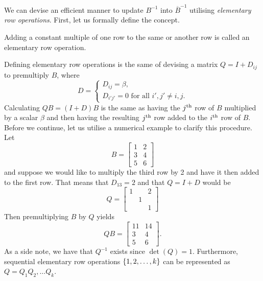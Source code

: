 We can devise an efficient manner to update $B^{-1}$ into $\overline{B}^{-1}$ utilising \emph{elementary row operations}. First, let us formally define the concept.

\begin{definition}
	Adding a constant multiple of one row to the same or another row is called an elementary row operation.
\end{definition}

Defining elementary row operations is the same of devising a matrix $Q = I + D_{ij}$ to premultiply $B$, where
%
\begin{equation*}
	D = \begin{cases}
		D_{ij} = \beta, \\
	    D_{i'j'} = 0 \text{ for all $i',j' \neq i,j$}.  
	\end{cases}
\end{equation*}
%
Calculating $QB = (I + D)B$ is the same as having the $j^\text{th}$ row of $B$ multiplied by a scalar $\beta$ and then having the resulting $j^\text{th}$ row added to the $i^\text{th}$ row of $B$. Before we continue, let us utilise a numerical example to clarify this procedure.
%
Let
%
\begin{equation*} 
	B = \begin{bmatrix} 1 & 2 \\ 3 & 4 \\ 5 & 6
		\end{bmatrix}
\end{equation*}
%
and suppose we would like to multiply the third row by 2 and have it then added to the first row. That means that $D_{13} = 2$ and that $Q = I + D$ would be
%
\begin{equation*} 
	Q = \begin{bmatrix} 1 & & 2\\ & 1 & \\ & & 1 	\end{bmatrix}
\end{equation*}
%
Then premultiplying $B$ by $Q$ yields
%
\begin{equation*}
	QB = \begin{bmatrix} 11 & 14 \\ 3 & 4 \\ 5 & 6
		 \end{bmatrix}.
\end{equation*}	
%
As a side note, we have that $Q^{-1}$ exists since $\det(Q) = 1$. Furthermore, sequential elementary row operations $\left\{ 1,2,\dots, k \right \}$ can be represented as $Q = Q_1Q_2,\dots Q_k$.

